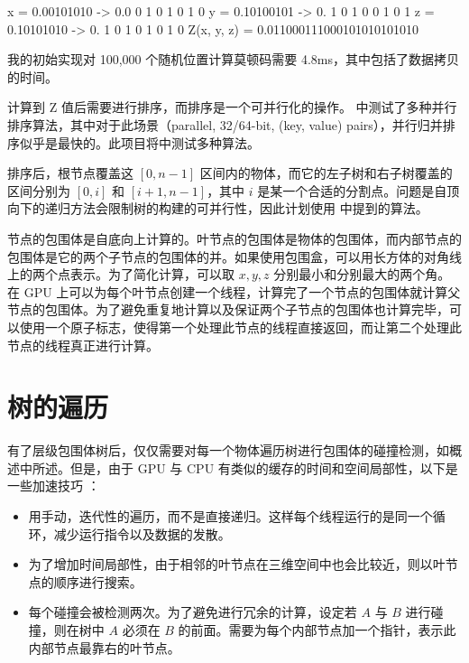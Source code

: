 \begin{codeblock}
                        x = 0.00101010 -> 0.0  0  1  0  1  0  1  0
                        y = 0.10100101 -> 0. 1  0  1  0  0  1  0  1
                        z = 0.10101010 -> 0.  1  0  1  0  1  0  1  0
                             Z(x, y, z) = 0.011000111000101010101010
\end{codeblock}

我的初始实现对 100,000 个随机位置计算莫顿码需要 4.8ms，其中包括了数据拷贝的时间。

\newpage

计算到 Z 值后需要进行排序，而排序是一个可并行化的操作。\cite{sorting} 中测试了多种并行排序算法，其中对于此场景（parallel, 32/64-bit, (key, value) pairs），并行归并排序似乎是最快的。此项目将中测试多种算法。

排序后，根节点覆盖这 $[0, n-1]$ 区间内的物体，而它的左子树和右子树覆盖的区间分别为 $[0, i]$ 和 $[i+1,n-1]$，其中 $i$ 是某一个合适的分割点。问题是自顶向下的递归方法会限制树的构建的可并行性，因此计划使用 \cite{Karras2012} 中提到的算法。

节点的包围体是自底向上计算的。叶节点的包围体是物体的包围体，而内部节点的包围体是它的两个子节点的包围体的并。如果使用包围盒，可以用长方体的对角线上的两个点表示。为了简化计算，可以取 $x,y,z$ 分别最小和分别最大的两个角。在 GPU 上可以为每个叶节点创建一个线程，计算完了一个节点的包围体就计算父节点的包围体。为了避免重复地计算以及保证两个子节点的包围体也计算完毕，可以使用一个原子标志，使得第一个处理此节点的线程直接返回，而让第二个处理此节点的线程真正进行计算。

\section{树的遍历}

有了层级包围体树后，仅仅需要对每一个物体遍历树进行包围体的碰撞检测，如概述中所述。但是，由于 GPU 与 CPU 有类似的缓存的时间和空间局部性，以下是一些加速技巧 \cite{nvidiaTreeTraversal}：

\begin{itemize}
    \item 用手动，迭代性的遍历，而不是直接递归。这样每个线程运行的是同一个循环，减少运行指令以及数据的发散。
    \item 为了增加时间局部性，由于相邻的叶节点在三维空间中也会比较近，则以叶节点的顺序进行搜索。
    \item 每个碰撞会被检测两次。为了避免进行冗余的计算，设定若 $A$ 与 $B$ 进行碰撞，则在树中 $A$ 必须在 $B$ 的前面。需要为每个内部节点加一个指针，表示此内部节点最靠右的叶节点。
\end{itemize}


\newpage

